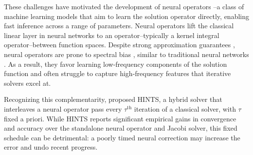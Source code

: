 \documentclass{article}
\newcommand{\ambuj}[1]{\textcolor{red}{AT: #1}}
\begin{document}
These challenges have motivated the development of neural operators \citep{kovachki2023neural}--a class of machine learning models that aim to learn the solution operator directly, enabling fast inference across a range of parameters. Neural operators lift the classical linear layer in neural networks to an operator--typically a kernel integral operator--between function spaces. Despite strong approximation guarantees \citep{chen1995universal}, neural operators are prone to spectral bias \citep{liu2021multiscale,liu2024mitigating,you2024mscalefno,khodakarami2025mitigating,xu2025understanding}, similar to traditional neural networks \citep{rahaman2019spectral,xu2019frequency,luo2019theory}. As a result, they favor learning low-frequency components of the solution function and often struggle to capture high-frequency features that iterative solvers excel at. 

Recognizing this complementarity, \citet{zhang2024blending} proposed HINTS, a hybrid solver that 
interleaves a neural operator pass every $\tau^{\text{th}}$ iteration of a classical solver, with $\tau$ fixed a priori.
While HINTS reports significant empirical gains in convergence and accuracy over the standalone neural operator and Jacobi solver, this fixed schedule can be detrimental: a poorly timed neural correction may increase the error and undo recent progress. 
\end{document}
